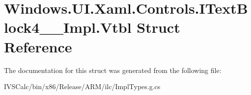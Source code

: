 \hypertarget{struct_windows_1_1_u_i_1_1_xaml_1_1_controls_1_1_i_text_block4_____impl_1_1_vtbl}{}\section{Windows.\+U\+I.\+Xaml.\+Controls.\+I\+Text\+Block4\+\_\+\+\_\+\+Impl.\+Vtbl Struct Reference}
\label{struct_windows_1_1_u_i_1_1_xaml_1_1_controls_1_1_i_text_block4_____impl_1_1_vtbl}


The documentation for this struct was generated from the following file\+:\begin{DoxyCompactItemize}
\item 
I\+V\+S\+Calc/bin/x86/\+Release/\+A\+R\+M/ilc/Impl\+Types.\+g.\+cs\end{DoxyCompactItemize}
